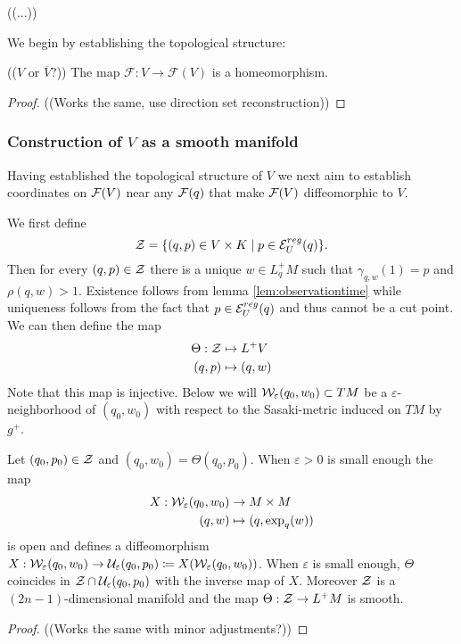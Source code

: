 ((...))

We begin by establishing the topological structure:
\begin{lemma}\label{lem:Fhomeo}
(($V$ or $\overline{V}$?))
The map $\mathcal{F}:V\to\mathcal{F}(V)$ is a homeomorphism.
\end{lemma}
\begin{proof}
((Works the same, use direction set reconstruction))
\end{proof}


\subsubsection{Construction of $V$ as a smooth manifold}
Having established the topological structure of $V$ we next aim to establish coordinates on $\mathcal{F}(V)$ near any $\mathcal{F}(q)$ that make $\mathcal{F}(V)$ diffeomorphic to $V$.

\begin{definition}[Coordinates on $V$]
We first define 
\[
    \mathcal{Z} = \{(q,p)\in V\times K \mid p\in \mathcal{E}_U^{reg}(q)\}.
\] 
Then for every $(q,p)\in \mathcal{Z}$ there is a unique $w\in L^+_qM$ such that $\gamma_{q,w}(1)=p$ and $\rho(q,w)>1$. Existence follows from lemma \ref{lem:observationtime} while uniqueness follows from the fact that $p\in \mathcal{E}_U^{reg}(q)$ and thus cannot be a cut point. 
We can then define the map
\begin{align*}
    \Theta:\mathcal{Z}&\mapsto L^+V\\
    (q,p)&\mapsto (q,w)
\end{align*}
Note that this map is injective.
Below we will $\mathcal{W}_\varepsilon(q_0,w_0)\subset TM$ be a $\varepsilon$-neighborhood of $(q_0,w_0)$ with respect to the Sasaki-metric induced on $TM$ by $g^+$.
\end{definition}

\begin{lemma}
Let $(q_0,p_0)\in \mathcal{Z}$ and $(q_0,w_0)=\Theta(q_0,p_0)$. When $\varepsilon>0$ is small enough the map 
\begin{align*}
    X:\mathcal{W}_\varepsilon(q_0,w_0) &\to M\times M\\
    (q,w) &\mapsto (q,\exp_q(w))
\end{align*}
is open and defines a diffeomorphism $X:\mathcal{W}_\varepsilon(q_0,w_0)\to \mathcal{U}_\varepsilon(q_0,p_0) \coloneqq X(\mathcal{W}_\varepsilon(q_0,w_0))$. When $\varepsilon$ is small enough, $\Theta$ coincides in $\mathcal{Z}\cap \mathcal{U}_\varepsilon(q_0,p_0)$ with the inverse map of $X$. Moreover $\mathcal{Z}$ is a $(2n-1)$-dimensional manifold and the map $\Theta:\mathcal{Z}\to L^+M$ is smooth.
\end{lemma}
\begin{proof}
((Works the same with minor adjustments?))
\end{proof}

